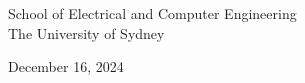 \begin{titlepage}
\begin{flushleft}
\begin{center}
        \vspace{0.8cm}

        School of Electrical and Computer Engineering\\
        The University of Sydney

        \vspace{0.8cm}
        
        December 16, 2024
        
        \vspace{2cm}
        
        \end{center}
        
    \end{flushleft}

\end{titlepage}

